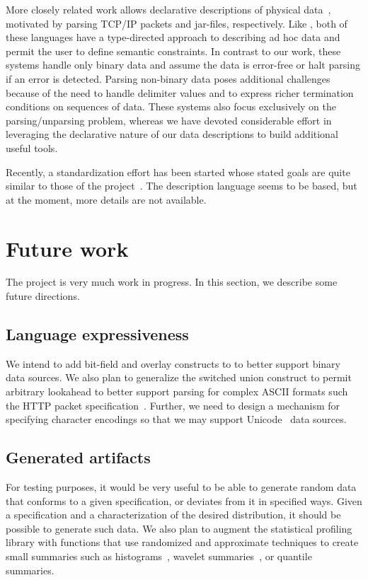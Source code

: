 \documentclass{sig-alternate}
\begin{document}
More closely related work allows declarative descriptions of physical
data~\cite{sigcomm00,gpce02}, motivated by parsing
\textsc{TCP/IP} packets and \java{} jar-files, respectively.  Like
\pads{}, both of these languages have a type-directed approach to
describing ad hoc data and permit the user to define semantic constraints.
In contrast to our
work, these systems handle only binary data and assume the data is
error-free or halt parsing if an error is detected. 
Parsing non-binary data poses additional challenges because of the need
to handle delimiter values and to express richer termination conditions
on sequences of data. These systems also
focus exclusively on the parsing/unparsing problem, whereas we have 
devoted considerable effort in leveraging the declarative nature of
our data descriptions to build additional useful tools.


Recently, a standardization effort has been started whose stated goals are quite similar to those of the \pads{} project~\cite{dfdl}. The description
language seems to be \xml{} based, but at the moment, more details are 
not available.

\section{Future work}
The \pads{} project is very much work in progress.  In
this section, we describe some future directions.

\subsection{Language expressiveness}  
We intend to add bit-field 
and overlay constructs to \pads{} to better support binary data sources.  We also plan to generalize the switched union construct to permit arbitrary lookahead to better support
parsing for complex ASCII formats such the HTTP packet specification~\cite{http}.  Further, we need to design a mechanism
for specifying character encodings so that we may support 
Unicode~\cite{unicode} data sources.

\subsection{Generated artifacts} 
For testing purposes, it would be very useful to be able to generate random data that conforms to a given specification, or 
deviates from it in specified ways.  Given a \pads{} specification and a characterization of the desired distribution, it should be possible to generate such data.  We also plan to augment the statistical profiling library with
functions that use randomized and approximate techniques to create
small summaries such as histograms~\cite{histograms,histograms-wavelets}, wavelet summaries~\cite{histograms-wavelets},
or quantile summaries\cite{quantiles}.
\end{document}
